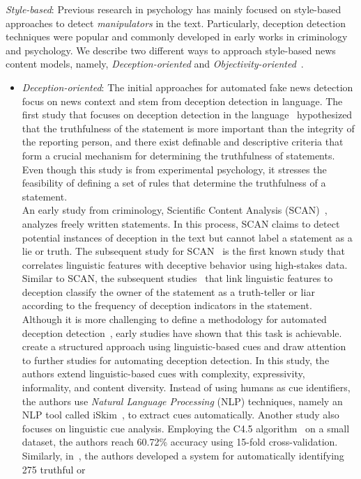 \begin{description}
    \item{\emph{Style-based}:} Previous research in psychology has mainly focused on style-based approaches to detect \emph{manipulators} in the text. Particularly, deception detection techniques were popular and commonly developed in early works in criminology and psychology. We describe two different ways to approach style-based news content models, namely, \emph{Deception-oriented} and \emph{Objectivity-oriented}~\parencite{FakeNewsDetectionOnSocialMediaADataMiningPerspective_Shu}.
    \begin{itemize}
        \item \emph{Deception-oriented}: The initial approaches for automated fake news detection focus on news context and stem from deception detection in language. The first study that focuses on deception detection in the language~\parencite{DieEntwicklungDerGerichtspsychologischen_Undeutsch} hypothesized that the truthfulness of the statement is more important than the integrity of the reporting person, and there exist definable and descriptive criteria that form a crucial mechanism for determining the truthfulness of statements. Even though this study is from experimental psychology, it stresses the feasibility of defining a set of rules that determine the truthfulness of a statement.\\ An early study from criminology, Scientific Content Analysis (SCAN)~\parencite{SCAN_Sapir1987}, analyzes freely written statements.  In this process, SCAN claims to detect potential instances of deception in the text but cannot label a statement as a lie or truth. The subsequent study for SCAN~\parencite{SCAN_Smith2001} is the first known study that correlates linguistic features with deceptive behavior using high-stakes data. Similar to SCAN, the subsequent studies~\parencite{CommunicationUnderStress_Adams, LyingWords_Newman} that link linguistic features to deception classify the owner of the statement as a truth-teller or liar according to the frequency of deception indicators in the statement.\\Although it is more challenging to define a methodology for automated deception detection~\parencite{TheAccuracyConfidenceRelation_DePaulo}, early studies have shown that this task is achievable. ~\cite{AutomatingLinguisticsBasedCues_Zhou} create a structured approach using linguistic-based cues and draw attention to further studies for automating deception detection. In this study, the authors extend linguistic-based cues with complexity, expressivity, informality, and content diversity. Instead of using humans as cue identifiers, the authors use \emph{Natural Language Processing} (NLP) techniques, namely an NLP tool called iSkim~\parencite{iSkim_Zhou}, to extract cues automatically. Another study also focuses on linguistic cue analysis. Employing the C4.5 algorithm~\parencite{C45_Salzberg} on a small dataset, the authors reach 60.72\% accuracy using 15-fold cross-validation.\\Similarly, in~\cite{VerificatoinAndImplementationofLBDeceptionIndicators_Bachenko}, the authors developed a system for automatically identifying 275 truthful or 
\end{itemize}
\end{description}
